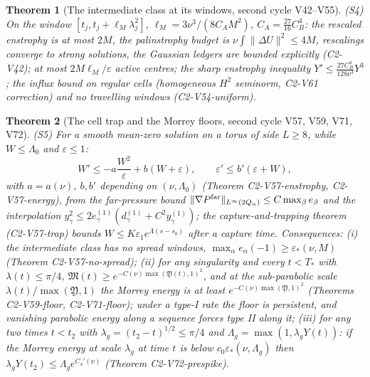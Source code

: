 \documentclass[11pt]{article}
\theoremstyle{plain}
\newtheorem{theorem}{Theorem}[section]
\theoremstyle{definition}
\theoremstyle{remark}
\begin{document}
\begin{theorem}[The intermediate class at its windows, second cycle V42--V55]
\label{thm:c4v1-windows}
(S4) On the window \([t_j,t_j+\ell_M\lambda_j^2]\), \(\ell_M=3\nu^3/(8C_AM^2)\),
\(C_A=\frac{27}{16}C_B^4\): the rescaled enstrophy is at most \(2M\), the
palinstrophy budget is \(\nu\int\|\Delta U\|^2\le4M\), rescalings converge
to strong solutions, the Gaussian ledgers are bounded explicitly
(C2-V42); at most \(2M\ell_M/\varepsilon\) active centres; the sharp enstrophy
inequality \(Y'\le\frac{27C_B^4}{128\nu^3}Y^3\); the influx bound on
regular cells (homogeneous \(H^2\) seminorm, C2-V61 correction) and no
travelling windows (C2-V54-uniform).
\end{theorem}

\begin{theorem}[The cell trap and the Morrey floors, second cycle V57, V59, V71, V72]
\label{thm:c4v1-trap}
(S5) For a smooth mean-zero solution on a torus of side \(L\ge8\), while
\(W\le\Lambda_0\) and \(\varepsilon\le1\):
\begin{equation}
 W'\le-a\frac{W^2}{\varepsilon}+b(W+\varepsilon),\qquad \varepsilon'\le b'(\varepsilon+W),
 \label{eq:c4v1-trap}
\end{equation}
with \(a=a(\nu)\), \(b,b'\) depending on \((\nu,\Lambda_0)\) (Theorem
C2-V57-enstrophy, C2-V57-energy), from the far-pressure bound
\(\|\nabla P^{\rm far}\|_{L^\infty(2Q_\alpha)}\le C\max_\beta e_\beta\) and the interpolation
\(y_\gamma^2\le2e^{(1)}_\gamma(d^{(1)}_\gamma+C^2y^{(1)}_\gamma)\); the capture-and-trapping
theorem (C2-V57-trap) bounds \(W\le K\varepsilon_1e^{\Lambda(s-s_0)}\) after a capture
time.  Consequences: (i) the intermediate class has no spread windows,
\(\max_\alpha e_\alpha(-1)\ge\varepsilon_*(\nu,M)\) (Theorem C2-V57-no-spread); (ii) for any
singularity and every \(t<T_*\) with \(\lambda(t)\le\pi/4\),
\(\mathfrak M(t)\ge e^{-C(\nu)\max(\mathfrak Y(t),1)^2}\), and at the sub-parabolic
scale \(\lambda(t)/\max(\mathfrak Y,1)\) the Morrey energy is at least
\(e^{-C(\nu)\max(\mathfrak Y,1)^2}\) (Theorems C2-V59-floor, C2-V71-floor);
under a type-I rate the floor is persistent, and vanishing parabolic
energy along a sequence forces type II along it; (iii) for any two
times \(t<t_2\) with \(\lambda_g=(t_2-t)^{1/2}\le\pi/4\) and
\(\Lambda_g=\max(1,\lambda_gY(t))\): if the Morrey energy at scale \(\lambda_g\) at time
\(t\) is below \(c_0\varepsilon_*(\nu,\Lambda_g)\) then \(\lambda_gY(t_2)\le\Lambda_ge^{C_4'(\nu)}\)
(Theorem C2-V72-prespike).
\end{theorem}
\end{document}
